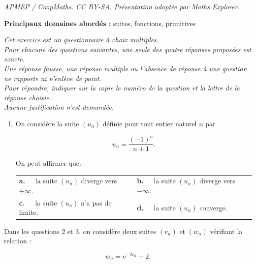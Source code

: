 \documentclass[10pt]{article}
\providecommand{\decosix}{}
\providecommand{\e}{{\mathrm{e}}}
\begin{document}
\noindent\textit{APMEP / CoopMaths. CC BY-SA. Présentation adaptée par Maths Explorer.}\par\medskip
\textbf{Principaux domaines abordés :} suites, fonctions, primitives

\medskip

\emph{Cet exercice est un questionnaire à choix multiples.\\
Pour chacune des questions suivantes, une seule des quatre réponses proposées est exacte.\\
Une réponse fausse, une réponse multiple ou l'absence de réponse à une question ne rapporte ni n'enlève de point.\\
Pour répondre, indiquer sur la copie le numéro de la question et la lettre de la réponse choisie.\\
Aucune justification n'est demandée.}

\medskip

\begin{enumerate}
\item On considère la suite $\left(u_n\right)$ définie pour tout entier naturel $n$ par

\[u_n  = \dfrac{(- 1)^n}{n + 1}.\]

On peut affirmer que:
\begin{center}
\begin{tabularx}{\linewidth}{X X}
\textbf{a.~~} la suite $\left(u_n\right)$ diverge vers $+\infty$. &\textbf{b.~~} la suite $\left(u_n\right)$ diverge vers $-\infty$.\\
\textbf{c.~~}  la suite $\left(u_n\right)$ n'a pas de limite. &\textbf{d.~~} la suite $\left(u_n\right)$ converge.
\end{tabularx}
\end{center}

\begin{center} \decosix \decosix \decosix  \end{center}
\end{enumerate}

Dans les questions 2 et 3, on considère deux suites $\left(v_n\right)$  et $\left(w_n\right)$ vérifiant la relation : 

\[w_n = \e^{- 2v_n} + 2.\]
\end{document}
